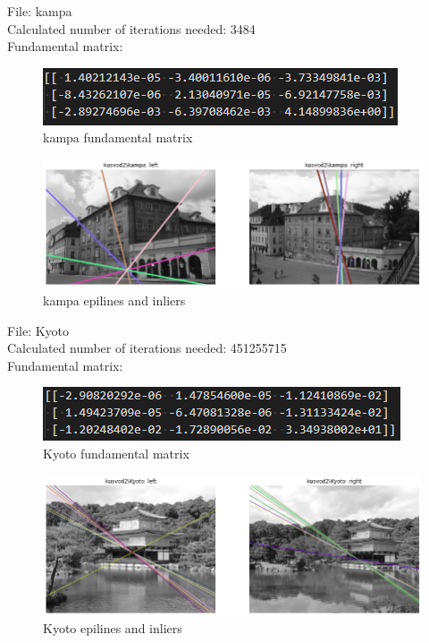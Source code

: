 \documentclass[10pt,a4paper]{article}
\begin{document}
File: kampa\\
Calculated number of iterations needed: 3484\\
Fundamental matrix:
\begin{figure}[H]
	\centering
	\includegraphics[width=0.7\linewidth]{img/kampaf}
	\caption{kampa fundamental matrix}
	\label{fig:kampaf}
\end{figure}
\begin{figure}[H]
	\centering
	\includegraphics[width=0.7\linewidth]{img/kampa}
	\caption{kampa epilines and inliers}
	\label{fig:kampa}
\end{figure}

File: Kyoto\\
Calculated number of iterations needed: 451255715\\
Fundamental matrix:
\begin{figure}[H]
	\centering
	\includegraphics[width=0.7\linewidth]{img/Kyotof}
	\caption{Kyoto fundamental matrix}
	\label{fig:Kyotof}
\end{figure}
\begin{figure}[H]
	\centering
	\includegraphics[width=0.7\linewidth]{img/Kyoto}
	\caption{Kyoto epilines and inliers}
	\label{fig:Kyoto}
\end{figure}
\end{document}
